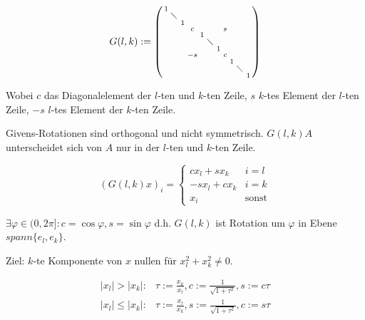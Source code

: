 $$G(l,k) := \left(\begin{smallmatrix}
1 &           &   &    &   &           &   &   &   &           &   \\
  & \diagdown &   &    &   &           &   &   &   &           &   \\
  &           & 1 &    &   &           &   &   &   &           &   \\
  &           &   &  c &   &           &   & s &   &           &   \\
  &           &   &    & 1 &           &   &   &   &           &   \\
  &           &   &    &   & \diagdown &   &   &   &           &   \\
  &           &   &    &   &           & 1 &   &   &           &   \\
  &           &   & -s &   &           &   & c &   &           &   \\
  &           &   &    &   &           &   &   & 1 &           &   \\
  &           &   &    &   &           &   &   &   & \diagdown &   \\
  &           &   &    &   &           &   &   &   &           & 1
\end{smallmatrix}\right)$$

Wobei $c$ das Diagonalelement der $l$-ten und $k$-ten Zeile, $s$ $k$-tes Element der $l$-ten Zeile, $-s$ $l$-tes Element der $k$-ten Zeile.

Givens-Rotationen sind orthogonal und nicht symmetrisch. $G(l,k)A$ unterscheidet sich von $A$ nur in der $l$-ten und $k$-ten Zeile.

\vspace{-4mm}
$$(G(l,k)x)_i = \begin{cases}
	cx_l  + sx_k & i=l \\
	-sx_l + cx_k & i=k \\
	x_i          & \text{sonst}
\end{cases}$$

$\exists \varphi \in (0,2\pi] : c=\cos{\varphi}, s=\sin{\varphi}$ d.h. $G(l,k)$ ist Rotation um $\varphi$ in Ebene $spann\{e_l,e_k\}$.

Ziel: $k$-te Komponente von $x$ nullen für $x_l^2+x_k^2 \neq 0$.

\vspace{-4mm}
\begin{align*}
	|x_l| > |x_k| : &\tau := \frac{x_k}{x_l}, c := \frac{1}{\sqrt{1+\tau^2}}, s := c\tau \\
	|x_l| \leq |x_k| : &\tau := \frac{x_l}{x_k}, s := \frac{1}{\sqrt{1+\tau^2}}, c := s\tau
\end{align*}

